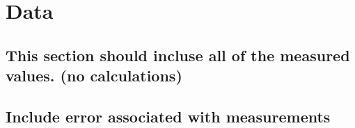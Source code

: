 \chapter{Data}
\section{This section should incluse all of the measured values. (no calculations)}
\section{Include error associated with measurements}
